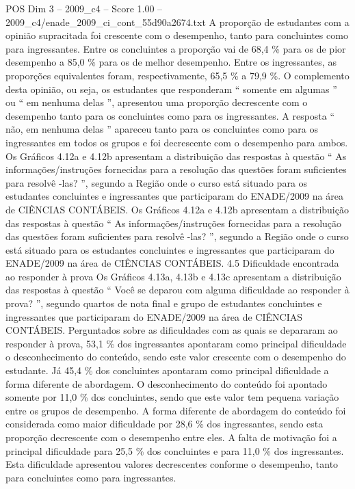 \begin{textsample}{POS Dim 3 – 2009\_c4 – Score 1.00 – 2009\_c4/enade\_2009\_ci\_cont\_55d90a2674.txt}
A proporção de estudantes com a opinião supracitada foi crescente com o desempenho, tanto para concluintes como para ingressantes.
Entre os concluintes a proporção vai de 68,4 \% para os de pior desempenho a 85,0 \% para os de melhor desempenho.
Entre os ingressantes, as proporções equivalentes foram, respectivamente, 65,5 \% a 79,9 \%.
O complemento desta opinião, ou seja, os estudantes que responderam “ somente em algumas ” ou “ em nenhuma delas ”, apresentou uma proporção decrescente com o desempenho tanto para os concluintes como para os ingressantes.
A resposta “ não, em nenhuma delas ” apareceu tanto para os concluintes como para os ingressantes em todos os grupos e foi decrescente com o desempenho para ambos.
Os Gráficos 4.12a e 4.12b apresentam a distribuição das respostas à questão “ As informações/instruções fornecidas para a resolução das questões foram suficientes para resolvê -las? ”, segundo a Região onde o curso está situado para os estudantes concluintes e ingressantes que participaram do ENADE/2009 na área de CIÊNCIAS CONTÁBEIS.
Os Gráficos 4.12a e 4.12b apresentam a distribuição das respostas à questão “ As informações/instruções fornecidas para a resolução das questões foram suficientes para resolvê -las? ”, segundo a Região onde o curso está situado para os estudantes concluintes e ingressantes que participaram do ENADE/2009 na área de CIÊNCIAS CONTÁBEIS. 4.5 Dificuldade encontrada ao responder à prova Os Gráficos 4.13a, 4.13b e 4.13c apresentam a distribuição das respostas à questão “ Você se deparou com alguma dificuldade ao responder à prova? ”, segundo quartos de nota final e grupo de estudantes concluintes e ingressantes que participaram do ENADE/2009 na área de CIÊNCIAS CONTÁBEIS.
Perguntados sobre as dificuldades com as quais se depararam ao responder à prova, 53,1 \% dos ingressantes apontaram como principal dificuldade o desconhecimento do conteúdo, sendo este valor crescente com o desempenho do estudante.
Já 45,4 \% dos concluintes apontaram como principal dificuldade a forma diferente de abordagem.
O desconhecimento do conteúdo foi apontado somente por 11,0 \% dos concluintes, sendo que este valor tem pequena variação entre os grupos de desempenho.
A forma diferente de abordagem do conteúdo foi considerada como maior dificuldade por 28,6 \% dos ingressantes, sendo esta proporção decrescente com o desempenho entre eles.
A falta de motivação foi a principal dificuldade para 25,5 \% dos concluintes e para 11,0 \% dos ingressantes.
Esta dificuldade apresentou valores decrescentes conforme o desempenho, tanto para concluintes como para ingressantes.

\end{textsample}
